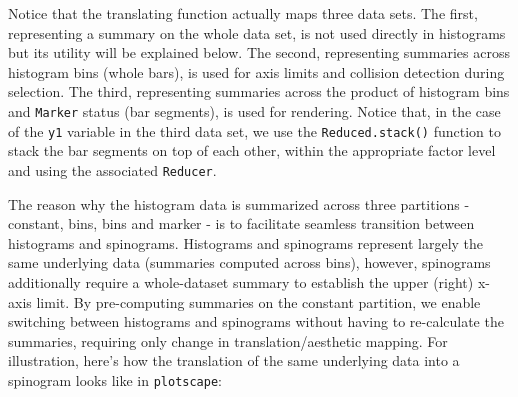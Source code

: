 \documentclass[
  openany]{book}
\theoremstyle{definition}
\theoremstyle{definition}
\theoremstyle{definition}
\theoremstyle{definition}
\theoremstyle{remark}
\begin{document}
Notice that the translating function actually maps three data sets. The first, representing a summary on the whole data set, is not used directly in histograms but its utility will be explained below. The second, representing summaries across histogram bins (whole bars), is used for axis limits and collision detection during selection. The third, representing summaries across the product of histogram bins and \texttt{Marker} status (bar segments), is used for rendering. Notice that, in the case of the \texttt{y1} variable in the third data set, we use the \texttt{Reduced.stack()} function to stack the bar segments on top of each other, within the appropriate factor level and using the associated \texttt{Reducer}.

The reason why the histogram data is summarized across three partitions - constant, bins, bins and marker - is to facilitate seamless transition between histograms and spinograms. Histograms and spinograms represent largely the same underlying data (summaries computed across bins), however, spinograms additionally require a whole-dataset summary to establish the upper (right) x-axis limit. By pre-computing summaries on the constant partition, we enable switching between histograms and spinograms without having to re-calculate the summaries, requiring only change in translation/aesthetic mapping. For illustration, here's how the translation of the same underlying data into a spinogram looks like in \texttt{plotscape}:
\end{document}
